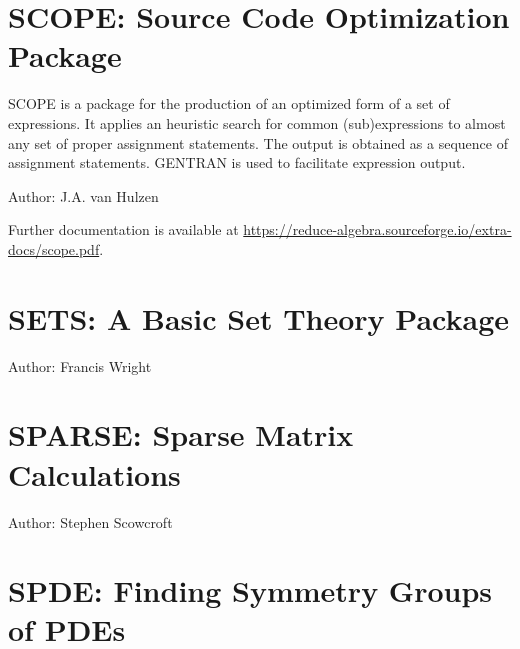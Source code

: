 

\newpage
\fi

\section{SCOPE: \REDUCE Source Code Optimization Package}
\label{SCOPE}

SCOPE is a package for the production of an optimized form of a set of
expressions.  It applies an heuristic search for common (sub)expressions
to almost any set of proper \REDUCE assignment statements.  The
output is obtained as a sequence of assignment statements.  GENTRAN is
used to facilitate expression output.

Author: J.A. van Hulzen

\begin{sloppypar}
  Further documentation is available at
  \url{https://reduce-algebra.sourceforge.io/extra-docs/scope.pdf}.
\end{sloppypar}

\newpage

\section{SETS: A Basic Set Theory Package}


Author: Francis Wright



\newpage

\section{SPARSE: Sparse Matrix Calculations}

Author: Stephen Scowcroft



\newpage

\section{SPDE: Finding Symmetry Groups of PDEs}

\label{package:SPDE}

